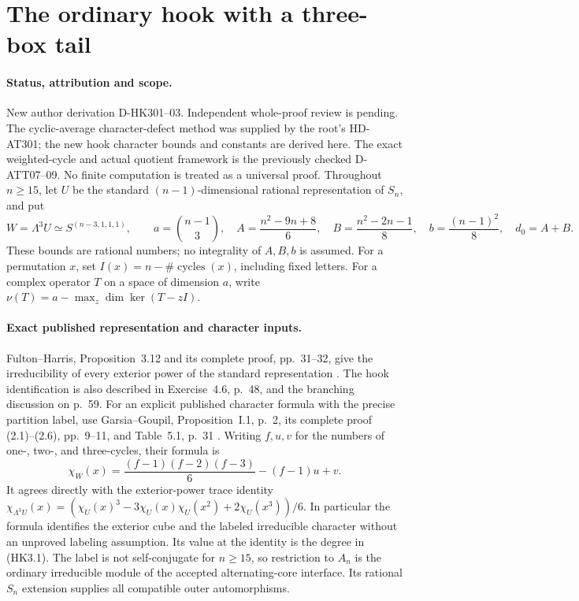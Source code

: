 \section{The ordinary hook with a three-box tail}
\label{sec:hook-three-source}

\paragraph{Status, attribution and scope.}
New author derivation D-HK301--03.  Independent whole-proof
review is pending.  The cyclic-average character-defect method
was supplied by the root's HD-AT301; the new hook character
bounds and constants are derived here.  The exact weighted-cycle
and actual quotient framework is the previously checked
D-ATT07--09.  No finite computation is treated as a universal
proof.  Throughout $n\ge15$, let $U$ be the standard
$(n-1)$-dimensional rational representation of $S_n$, and put
\[
 W=\Lambda^3U\simeq S^{(n-3,1,1,1)},\qquad
 a=\binom{n-1}{3},\quad
 A=\frac{n^2-9n+8}{6},\quad
 B=\frac{n^2-2n-1}{8},\quad
 b=\frac{(n-1)^2}{8},\quad d_0=A+B.
 \tag{HK3.1}
\]
These bounds are rational numbers; no integrality of $A,B,b$
is assumed.  For a permutation $x$, set
$I(x)=n-\#\operatorname{cycles}(x)$, including fixed letters.
For a complex operator $T$ on a space of dimension $a$, write
$\nu(T)=a-\max_z\dim\ker(T-zI)$.

\paragraph{Exact published representation and character inputs.}
Fulton--Harris, Proposition~3.12 and its complete proof,
pp.~31--32, give the irreducibility of every exterior power
of the standard representation
\cite[Proposition~3.12, pp.~31--32]{HK:FultonHarris1991}.
The hook identification is also described in Exercise~4.6,
p.~48, and the branching discussion on p.~59.
For an explicit published character formula with the precise
partition label, use Garsia--Goupil, Proposition~I.1, p.~2,
its complete proof (2.1)--(2.6), pp.~9--11, and Table~5.1,
p.~31 \cite[Proposition~I.1; Table~5.1]{HK:GarsiaGoupil2009}.
Writing $f,u,v$ for the numbers of one-, two-, and three-cycles,
their formula is
\[
 \chi_W(x)=\frac{(f-1)(f-2)(f-3)}6-(f-1)u+v.
 \tag{HK3.2}
\]
It agrees directly with the exterior-power trace identity
$\chi_{\Lambda^3U}(x)=
(\chi_U(x)^3-3\chi_U(x)\chi_U(x^2)+2\chi_U(x^3))/6$.
In particular the formula identifies the exterior cube and
the labeled irreducible character without an unproved labeling
assumption.  Its value at the identity is the degree in (HK3.1).
The label is not self-conjugate for $n\ge15$, so restriction
to $A_n$ is the ordinary irreducible module of the accepted
alternating-core interface.  Its rational $S_n$ extension
supplies all compatible outer automorphisms.

